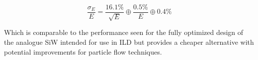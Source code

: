 \begin{equation}
  \frac{\sigma_E}{E}=\frac{16.1\%}{\sqrt{E}} \oplus \frac{0.5\%}{E} \oplus 0.4\%
\end{equation}

Which is comparable to the performance seen for the fully optimized design of the analogue SiW intended for use in \ac{ILD} but provides a cheaper alternative with potential improvements for particle flow techniques.

